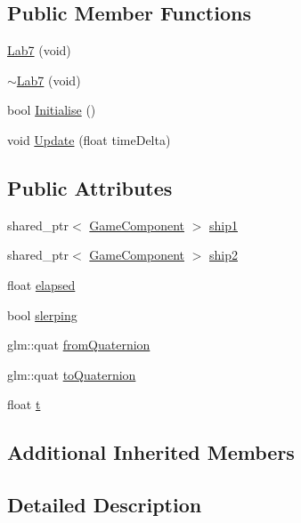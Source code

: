 \subsection*{Public Member Functions}
\begin{DoxyCompactItemize}
\item 
\hyperlink{class_b_g_e_1_1_lab7_aa856b08bdd5ed5720e1766e645dbc14f}{Lab7} (void)
\item 
\hyperlink{class_b_g_e_1_1_lab7_aa6cb2939cfce34e4aff7f5da7465edc4}{$\sim$\-Lab7} (void)
\item 
bool \hyperlink{class_b_g_e_1_1_lab7_ac7d2597bb842edcf70174b436c8811fd}{Initialise} ()
\item 
void \hyperlink{class_b_g_e_1_1_lab7_a0e9a409b00ca05c7eeff78cd5aef4f6e}{Update} (float time\-Delta)
\end{DoxyCompactItemize}
\subsection*{Public Attributes}
\begin{DoxyCompactItemize}
\item 
shared\-\_\-ptr$<$ \hyperlink{class_b_g_e_1_1_game_component}{Game\-Component} $>$ \hyperlink{class_b_g_e_1_1_lab7_ad6f5c61ac49db32554e321834c1e1309}{ship1}
\item 
shared\-\_\-ptr$<$ \hyperlink{class_b_g_e_1_1_game_component}{Game\-Component} $>$ \hyperlink{class_b_g_e_1_1_lab7_a6d78f63d3afda6ddd660d008e1175ff6}{ship2}
\item 
float \hyperlink{class_b_g_e_1_1_lab7_a6c256271ea30cf783ae969560b7a4050}{elapsed}
\item 
bool \hyperlink{class_b_g_e_1_1_lab7_a8cd5f0601c936db337a92f26288c7a1a}{slerping}
\item 
glm\-::quat \hyperlink{class_b_g_e_1_1_lab7_a7c21f4e4b7742387e8e226774a06459c}{from\-Quaternion}
\item 
glm\-::quat \hyperlink{class_b_g_e_1_1_lab7_a70afa9a9116b7657373106f3b8e03527}{to\-Quaternion}
\item 
float \hyperlink{class_b_g_e_1_1_lab7_adff10790b0f22dfbf447417c131b6de8}{t}
\end{DoxyCompactItemize}
\subsection*{Additional Inherited Members}


\subsection{Detailed Description}


